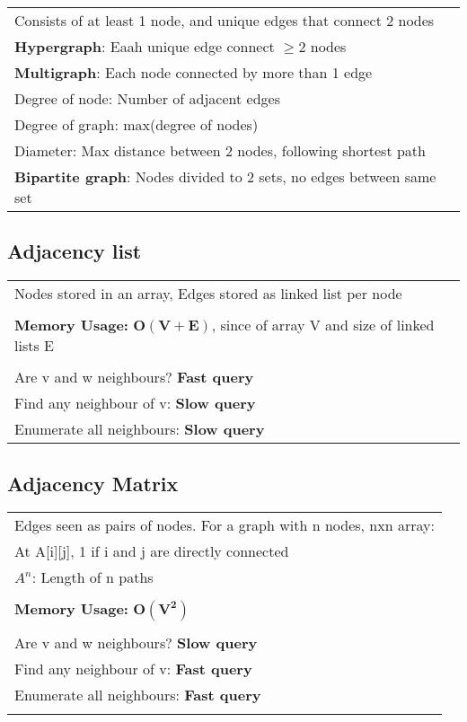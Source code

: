 \documentclass{article}
\begin{document}
    \begin{tabular}{l}
        Consists of at least 1 node, and unique edges that connect 2 nodes\\
        \textbf{Hypergraph}: Eaah unique edge connect $\geq 2$ nodes\\
        \textbf{Multigraph}: Each node connected by more than 1 edge\\
        Degree of node: Number of adjacent edges\\
        Degree of graph: max(degree of nodes)\\
        Diameter: Max distance between 2 nodes, following shortest path\\
        \textbf{Bipartite graph}: Nodes divided to 2 sets, no edges between same set\\
    \end{tabular}

    \subsection{Adjacency list}

    \begin{tabular}{l}
        Nodes stored in an array, Edges stored as linked list per node\\\\
        \textbf{Memory Usage: }$\bm{O(V + E)}$, since of array V and size of linked lists E\\\\
        Are v and w neighbours? \textbf{Fast query}\\
        Find any neighbour of v: \textbf{Slow query}\\
        Enumerate all neighbours: \textbf{Slow query}\\
    \end{tabular}

    \subsection{Adjacency Matrix}

    \begin{tabular}{l}
        Edges seen as pairs of nodes. For a graph with n nodes, nxn array:\\
        At A[i][j], 1 if i and j are directly connected\\
        $A^{n}$: Length of n paths\\\\
        \textbf{Memory Usage:} $\bm{O(V^{2})}$\\\\
        Are v and w neighbours? \textbf{Slow query}\\
        Find any neighbour of v: \textbf{Fast query}\\
        Enumerate all neighbours: \textbf{Fast query}\\\\
    \end{tabular}
\end{document}
